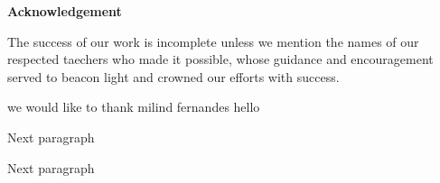 \begin{center}
\begin{huge}
\bfseries{Acknowledgement}\\
\end{huge}
\end{center}
\vspace{1cm}
The success of our work is incomplete unless we mention the names of our respected taechers who made it possible, whose guidance and encouragement served to beacon light and crowned our efforts with success.

we would like to thank milind fernandes
hello

\noindent Next paragraph

\noindent Next paragraph